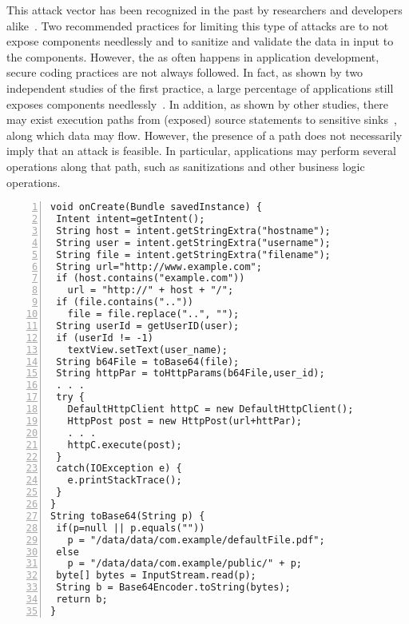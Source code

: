 This attack vector has been recognized in the past by researchers and developers alike~\cite{Lu:CHEX:2012,chin2011analyzing,AppIntent,IntentsForDevelopers}. Two recommended practices for limiting this type of attacks are to not expose components needlessly and to sanitize and validate the data in input to the components. However, the as often happens in application development, secure coding practices are not always followed. In fact, as shown by two independent studies of the first practice, a large percentage of applications still exposes components needlessly~\cite{Epicc,chin2011analyzing}. In addition, as shown by other studies, there may exist execution paths from (exposed) source statements to sensitive sinks~\cite{Lu:CHEX:2012}, along which data may flow. However, the presence of a path does not necessarily imply that an attack is feasible. In particular, applications may perform several operations along that path, such as sanitizations and other business logic operations. 

\begin{lstlisting}[caption={Source code of a vulnerable application},label={lst:example},numbers=left,basicstyle=\ttfamily\scriptsize ]
void onCreate(Bundle savedInstance) {
 Intent intent=getIntent();
 String host = intent.getStringExtra("hostname");
 String user = intent.getStringExtra("username");
 String file = intent.getStringExtra("filename");
 String url="http://www.example.com";
 if (host.contains("example.com"))
   url = "http://" + host + "/";
 if (file.contains(".."))
   file = file.replace("..", "");
 String userId = getUserID(user);
 if (userId != -1)
   textView.setText(user_name);
 String b64File = toBase64(file);
 String httpPar = toHttpParams(b64File,user_id);
 . . .
 try {
   DefaultHttpClient httpC = new DefaultHttpClient();
   HttpPost post = new HttpPost(url+httPar);
   . . .
   httpC.execute(post);
 }
 catch(IOException e) {
   e.printStackTrace();
 }
}
String toBase64(String p) {
 if(p=null || p.equals(""))
   p = "/data/data/com.example/defaultFile.pdf";
 else
   p = "/data/data/com.example/public/" + p;
 byte[] bytes = InputStream.read(p);
 String b = Base64Encoder.toString(bytes);
 return b;
}
\end{lstlisting}

